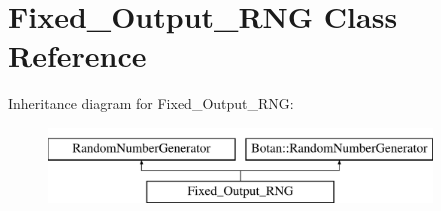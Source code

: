 \hypertarget{classFixed__Output__RNG}{\section{Fixed\-\_\-\-Output\-\_\-\-R\-N\-G Class Reference}
\label{classFixed__Output__RNG}
}
Inheritance diagram for Fixed\-\_\-\-Output\-\_\-\-R\-N\-G\-:\begin{figure}[H]
\begin{center}
\leavevmode
\includegraphics[height=2.000000cm]{classFixed__Output__RNG}
\end{center}
\end{figure}
